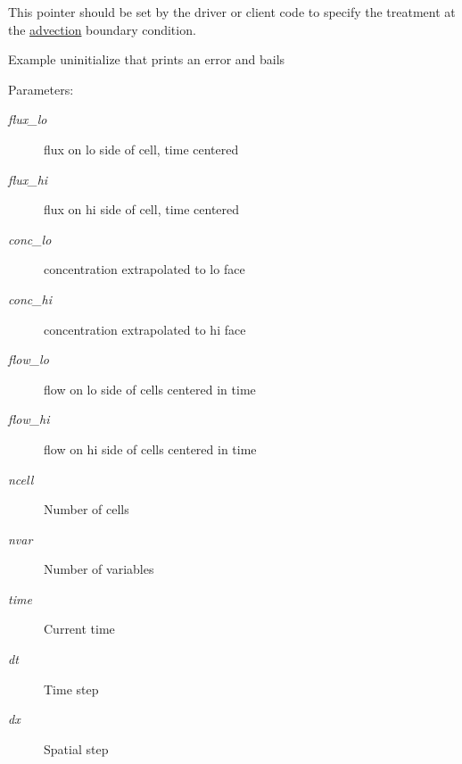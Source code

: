This pointer should be set by the driver or client code to specify the treatment at the \hyperlink{a00049}{advection} boundary condition. 

Example uninitialize that prints an error and bails \begin{Desc}
\item[Parameters:]
\begin{description}
\item[{\em flux\_\-lo}]flux on lo side of cell, time centered\item[{\em flux\_\-hi}]flux on hi side of cell, time centered\item[{\em conc\_\-lo}]concentration extrapolated to lo face\item[{\em conc\_\-hi}]concentration extrapolated to hi face\item[{\em flow\_\-lo}]flow on lo side of cells centered in time\item[{\em flow\_\-hi}]flow on hi side of cells centered in time\item[{\em ncell}]Number of cells\item[{\em nvar}]Number of variables\item[{\em time}]Current time\item[{\em dt}]Time step \item[{\em dx}]Spatial step \end{description}
\end{Desc}
